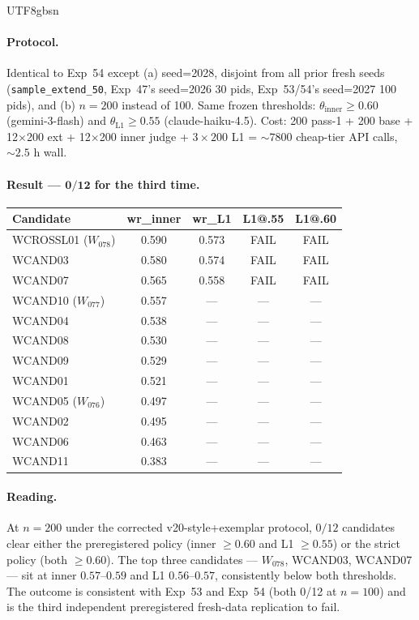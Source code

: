 \documentclass{article}
\begin{document}
\begin{CJK*}{UTF8}{gbsn}
\paragraph{Protocol.} Identical to Exp~54 except (a) seed=2028,
disjoint from all prior fresh seeds (\texttt{sample\_extend\_50},
Exp~47's seed=2026 30 pids, Exp~53/54's seed=2027 100 pids), and
(b) \(n=200\) instead of 100. Same frozen thresholds:
\(\theta_{\mathrm{inner}} \geq 0.60\) (gemini-3-flash) and
\(\theta_{\mathrm{L1}} \geq 0.55\) (claude-haiku-4.5). Cost: 200
pass-1 + 200 base + 12$\times$200 ext + 12$\times$200 inner judge
+ \(3\times200\) L1 = \(\sim 7800\) cheap-tier API calls,
\(\sim 2.5\) h wall.

\paragraph{Result --- \(\mathbf{0/12}\) for the third time.}

\begin{center}\small
\begin{tabular}{l c c c c}
  \toprule
  Candidate & wr\_inner & wr\_L1 & L1@.55 & L1@.60 \\
  \midrule
  WCROSSL01 (\(W_{078}\)) & 0.590 & 0.573 & FAIL & FAIL \\
  WCAND03                 & 0.580 & 0.574 & FAIL & FAIL \\
  WCAND07                 & 0.565 & 0.558 & FAIL & FAIL \\
  WCAND10 (\(W_{077}\))   & 0.557 & ---   & ---  & ---  \\
  WCAND04                 & 0.538 & ---   & ---  & ---  \\
  WCAND08                 & 0.530 & ---   & ---  & ---  \\
  WCAND09                 & 0.529 & ---   & ---  & ---  \\
  WCAND01                 & 0.521 & ---   & ---  & ---  \\
  WCAND05 (\(W_{076}\))   & 0.497 & ---   & ---  & ---  \\
  WCAND02                 & 0.495 & ---   & ---  & ---  \\
  WCAND06                 & 0.463 & ---   & ---  & ---  \\
  WCAND11                 & 0.383 & ---   & ---  & ---  \\
  \bottomrule
\end{tabular}
\end{center}

\paragraph{Reading.} At \(n=200\) under the corrected
v20-style+exemplar protocol, \(0/12\) candidates clear either the
preregistered policy (inner \(\geq 0.60\) and L1 \(\geq 0.55\))
or the strict policy (both \(\geq 0.60\)). The top three
candidates --- \(W_{078}\), WCAND03, WCAND07 --- sit at inner
\(0.57\)--\(0.59\) and L1 \(0.56\)--\(0.57\), consistently below
both thresholds. The outcome is consistent with Exp~53 and Exp~54
(both 0/12 at \(n=100\)) and is the third independent
preregistered fresh-data replication to fail.


\end{CJK*}
\end{document}
